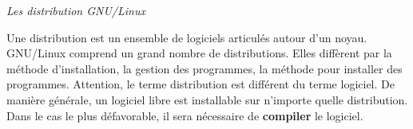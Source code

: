 \documentclass[11pt,oneside]{article}
\begin{document}
\begin{rem}
\textit{Les distribution GNU/Linux}

Une distribution est un ensemble de logiciels articulés autour d'un noyau. GNU/Linux comprend un grand nombre de distributions. Elles diffèrent par la méthode d'installation, la gestion des programmes, la méthode pour installer des programmes. Attention, le terme distribution est différent du terme logiciel. De manière générale, un logiciel libre est installable sur n'importe quelle distribution. Dans le cas le plus défavorable, il sera nécessaire de \textbf{compiler} le logiciel.


%
%
%

\end{rem}
\end{document}
